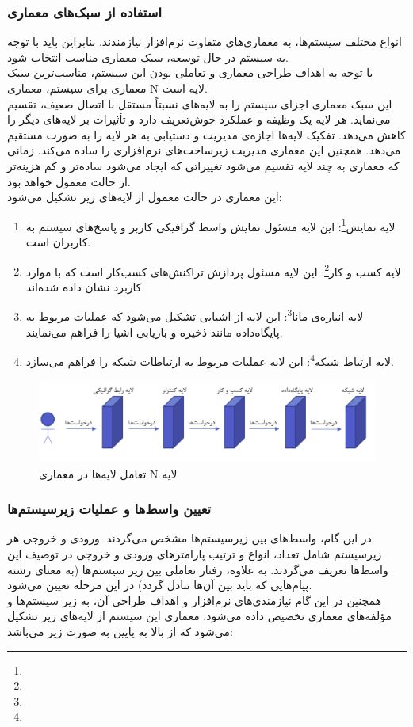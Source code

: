 \documentclass[12pt]{article}
\begin{document}
	\subsubsection{استفاده از سبک‌های معماری}
	انواع مختلف سیستم‌ها، به معماری‌های متفاوت نرم‌افزار نیازمندند. بنابراین باید با توجه به سیستم در حال توسعه، سبک معماری مناسب انتخاب شود.\\
	با توجه به اهداف طراحی معماری و تعاملی بودن این سیستم، مناسب‌ترین سبک معماری برای سیستم، معماری N لایه است.\\
	این سبک معماری اجزای سیستم را به لایه‌های نسبتاً مستقل با اتصال ضعیف، تقسیم می‌نماید. هر لایه یک وظیفه و عملکرد خوش‌تعریف دارد و تأثیرات بر لایه‌های دیگر را کاهش می‌دهد. تفکیک لایه‌ها اجازه‌ی مدیریت و دستیابی به هر لایه را به صورت مستقیم می‌دهد. همچنین این معماری مدیریت زیرساخت‌های نرم‌افزاری را ساده می‌کند. زمانی که معماری به چند لایه تقسیم می‌شود تغییراتی که ایجاد می‌شود ساده‌تر و کم هزینه‌تر از حالت معمول خواهد بود.\\
	این معماری در حالت معمول از لایه‌های زیر تشکیل می‌شود:
	\begin{enumerate}
		\item لایه نمایش\footnote{}:
		این لایه مسئول نمایش واسط گرافیکی کاربر و پاسخ‌های سیستم به کاربران است.
		\item لایه کسب و کار\footnote{}:
		این لایه مسئول پردازش تراکنش‌های کسب‌کار است که با موارد کاربرد نشان داده شده‌اند.
		\item لایه انباره‌ی مانا\footnote{}:
		این لایه از اشیایی تشکیل می‌شود که عملیات مربوط به پایگاه‌داده مانند ذخیره و بازیابی اشیا را فراهم می‌نمایند.
		\item لایه ارتباط شبکه\footnote{}:
		این لایه عملیات مربوط به ارتباطات شبکه را فراهم می‌سازد.
	\end{enumerate}
	\begin{figure}[H]
		\centering
		\includegraphics[width=0.9\linewidth]{files/2}
		\caption{تعامل لایه‌ها در معماری N لایه}
		\label{fig:2}
	\end{figure}

	\subsubsection{تعیین واسط‌ها و عملیات زیرسیستم‌ها}
	در این گام، واسط‌های بین زیرسیستم‌ها مشخص می‌گردند. ورودی و خروجی هر زیرسیستم شامل تعداد، انواع و ترتیب پارامترهای ورودی و خروجی در توصیف این واسط‌ها تعریف می‌گردند. به علاوه، رفتار تعاملی بین زیر سیستم‌ها (به معنای رشته پیام‌هایی که باید بین آن‌ها تبادل گردد) در این مرحله تعیین می‌شود.\\
	همچنین در این گام نیازمندی‌های نرم‌افزار و اهداف طراحی آن، به زیر سیستم‌ها و مؤلفه‌های معماری تخصیص داده می‌شود.
	معماری این سیستم از لایه‌های زیر تشکیل می‌شود که از بالا به پایین به صورت زیر می‌باشد:
\end{document}
